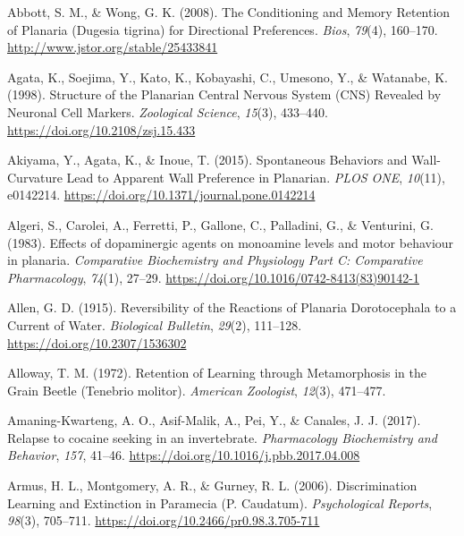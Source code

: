 \documentclass[
  jou,
  floatsintext,
  longtable,
  nolmodern,
  notxfonts,
  notimes,
  donotrepeattitle,
  colorlinks=true,linkcolor=blue,citecolor=blue,urlcolor=blue]{apa7}
\newlength{\cslhangindent}
\newenvironment{CSLReferences}[2] %
 {\begin{list}{}{%
  \setlength{\itemindent}{0pt}
  \setlength{\leftmargin}{0pt}
  \setlength{\parsep}{0pt}
  \ifodd #1
   \setlength{\leftmargin}{\cslhangindent}
   \setlength{\itemindent}{-1\cslhangindent}
  \fi
  \setlength{\itemsep}{#2\baselineskip}}}
 {\end{list}}
\begin{document}
\label{refs}
\begin{CSLReferences}{1}{0}
Abbott, S. M., \& Wong, G. K. (2008). The {Conditioning} and {Memory}
{Retention} of {Planaria} ({Dugesia} tigrina) for {Directional}
{Preferences}. \emph{Bios}, \emph{79}(4), 160--170.
\url{http://www.jstor.org/stable/25433841}

Agata, K., Soejima, Y., Kato, K., Kobayashi, C., Umesono, Y., \&
Watanabe, K. (1998). Structure of the {Planarian} {Central} {Nervous}
{System} ({CNS}) {Revealed} by {Neuronal} {Cell} {Markers}.
\emph{Zoological Science}, \emph{15}(3), 433--440.
\url{https://doi.org/10.2108/zsj.15.433}

Akiyama, Y., Agata, K., \& Inoue, T. (2015). Spontaneous {Behaviors} and
{Wall}-{Curvature} {Lead} to {Apparent} {Wall} {Preference} in
{Planarian}. \emph{PLOS ONE}, \emph{10}(11), e0142214.
\url{https://doi.org/10.1371/journal.pone.0142214}

Algeri, S., Carolei, A., Ferretti, P., Gallone, C., Palladini, G., \&
Venturini, G. (1983). Effects of dopaminergic agents on monoamine levels
and motor behaviour in planaria. \emph{Comparative Biochemistry and
Physiology Part C: Comparative Pharmacology}, \emph{74}(1), 27--29.
\url{https://doi.org/10.1016/0742-8413(83)90142-1}

Allen, G. D. (1915). Reversibility of the {Reactions} of {Planaria}
{Dorotocephala} to a {Current} of {Water}. \emph{Biological Bulletin},
\emph{29}(2), 111--128. \url{https://doi.org/10.2307/1536302}

Alloway, T. M. (1972). Retention of {Learning} through {Metamorphosis}
in the {Grain} {Beetle} ({Tenebrio} molitor). \emph{American Zoologist},
\emph{12}(3), 471--477.

Amaning-Kwarteng, A. O., Asif-Malik, A., Pei, Y., \& Canales, J. J.
(2017). Relapse to cocaine seeking in an invertebrate.
\emph{Pharmacology Biochemistry and Behavior}, \emph{157}, 41--46.
\url{https://doi.org/10.1016/j.pbb.2017.04.008}

Armus, H. L., Montgomery, A. R., \& Gurney, R. L. (2006). Discrimination
{Learning} and {Extinction} in {Paramecia} ({P}. {Caudatum}).
\emph{Psychological Reports}, \emph{98}(3), 705--711.
\url{https://doi.org/10.2466/pr0.98.3.705-711}


\end{CSLReferences}
\end{document}
